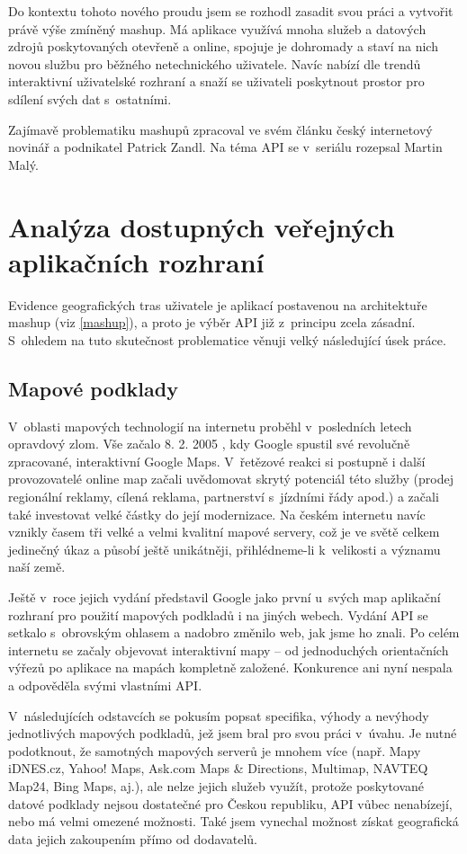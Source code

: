 Do kontextu tohoto nového proudu jsem se rozhodl zasadit svou práci a
vytvořit právě výše zmíněný mashup. Má aplikace využívá mnoha služeb a
datových zdrojů poskytovaných otevřeně a online, spojuje je dohromady
a staví na nich novou službu pro běžného netechnického uživatele.
Navíc nabízí dle trendů interaktivní uživatelské rozhraní a snaží se
uživateli poskytnout prostor pro sdílení svých dat s~ostatními.

Zajímavě problematiku mashupů zpracoval ve svém článku
\cite{certodejMashup} český internetový novinář a podnikatel Patrick
Zandl. Na téma API se v~seriálu \cite{misantropApi} rozepsal Martin
Malý.

\chapter{Analýza dostupných veřejných aplikačních rozhraní}

Evidence geografických tras uživatele je aplikací postavenou na
architektuře mashup (viz \ref{mashup}), a proto je výběr API již
z~principu zcela zásadní. S~ohledem na tuto skutečnost problematice
věnuji velký následující úsek práce.

\section{Mapové podklady}\label{vybermap}
V~oblasti mapových technologií na internetu proběhl
v~posledních letech opravdový zlom. Vše začalo 8. 2.
2005 \cite{gmaps}, kdy Google spustil své revolučně zpracované,
interaktivní Google Maps. V~řetězové reakci si postupně i další
provozovatelé online map začali uvědomovat skrytý potenciál této
služby (prodej regionální reklamy, cílená reklama, partnerství
s~jízdními řády apod.) a začali také investovat velké částky do její
modernizace. Na českém internetu navíc vznikly časem tři velké a
velmi kvalitní mapové servery, což je ve světě celkem jedinečný úkaz
a působí ještě unikátněji, přihlédneme-li k~velikosti a významu naší
země.

Ještě v~roce jejich vydání představil Google jako první u~svých
map aplikační rozhraní pro použití mapových podkladů i na jiných
webech. Vydání API se setkalo s~obrovským ohlasem \cite{gmapsSuccess}
a nadobro změnilo web, jak jsme ho znali. Po celém internetu se začaly objevovat
interaktivní mapy -- od jednoduchých orientačních výřezů po aplikace
na mapách kompletně založené. Konkurence ani nyní nespala a odpověděla
svými vlastními API.

V~následujících odstavcích se pokusím popsat specifika, výhody a
nevýhody jednotlivých mapových podkladů, jež jsem bral pro svou práci
v~úvahu. Je nutné podotknout, že samotných mapových serverů je mnohem
více (např. Mapy iDNES.cz, Yahoo! Maps, Ask.com Maps \& Directions,
Multimap, NAVTEQ Map24, Bing Maps, aj.), ale nelze jejich služeb využít,
protože poskytované datové podklady nejsou dostatečné pro Českou
republiku, API vůbec nenabízejí, nebo má velmi omezené možnosti. Také
jsem vynechal možnost získat geografická data jejich zakoupením přímo od dodavatelů.

